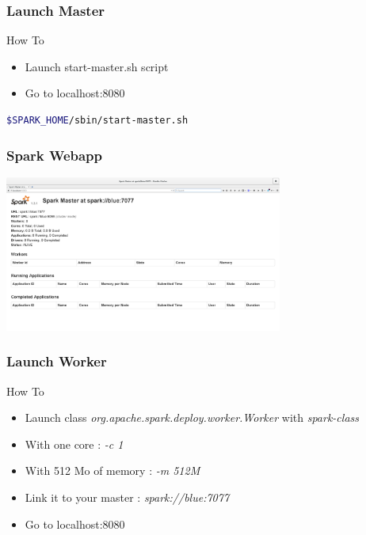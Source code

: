 \documentclass[slidetop,9pt,utf8]{beamer}
\begin{document}
\begin{CJK}{UTF8}{gbsn}
\begin{frame}[fragile]
  \frametitle{Launch Master}

  \begin{block}{How To}
    \begin{itemize}
      \item Launch start-master.sh script
      \item Go to localhost:8080
    \end{itemize}
  \end{block}

  \begin{lstlisting}[language=bash, style=terminal-large]
$SPARK_HOME/sbin/start-master.sh
  \end{lstlisting} 

\end{frame}

\begin{frame}

  \frametitle{Spark Webapp}

  \includegraphics[width=345px]{images/spark_webapp.png}

\end{frame}

\begin{frame}[fragile]

  \frametitle{Launch Worker}

  \begin{block}{How To}
    \begin{itemize}
      \item Launch class \textit{org.apache.spark.deploy.worker.Worker} with \textit{spark-class}
      \item With one core : \textit{-c 1}
      \item With 512 Mo of memory : \textit{-m 512M}
      \item Link it to your master : \textit{spark://blue:7077}
      \item Go to localhost:8080
    \end{itemize}
  \end{block}


\end{frame}
\end{CJK}
\end{document}
